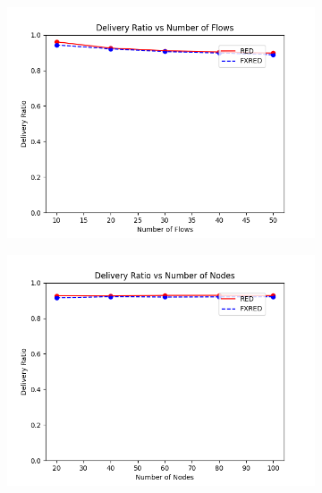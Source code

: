 \documentclass[10pt]{report}
\begin{document}
\begin{figure}
    \centering
    \begin{subfigure}{.5\textwidth}
        \includegraphics[width=1\linewidth]{static/graphs/wired/Delivery Ratio vs Number of Flows.png}
    \end{subfigure}%
    \begin{subfigure}{.5\textwidth}
        \includegraphics[width=1\linewidth]{static/graphs/wired/Delivery Ratio vs Number of Nodes.png}
    \end{subfigure}
    \begin{subfigure}{.5\textwidth}

\end{subfigure}
\end{figure}
\end{document}
